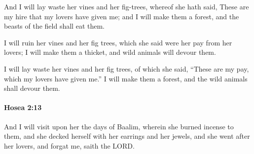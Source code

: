 			\begin{versebox}
					\item[BHS] 
					\item[LXX] 
					\item[ASV] And I will lay waste her vines and her fig-trees, whereof she hath said, These are my hire that my lovers have given me; and I will make them a forest, and the beasts of the field shall eat them.
					\item[NIV] I will ruin her vines and her fig trees, which she said were her pay from her lovers; I will make them a thicket, and wild animals will devour them.
					\item[NRSV] I will lay waste her vines and her fig trees, of which she said, “These are my pay, which my lovers have given me.” I will make them a forest, and the wild animals shall devour them.
			\end{versebox}

		\paragraph{Hosea 2:13} %
			\label{HOSEA-2-13}

			And I will visit upon her the days of Baalim, wherein she burned incense to them, and she decked herself with her earrings and her jewels, and she went after her lovers, and forgat me, saith the LORD.

